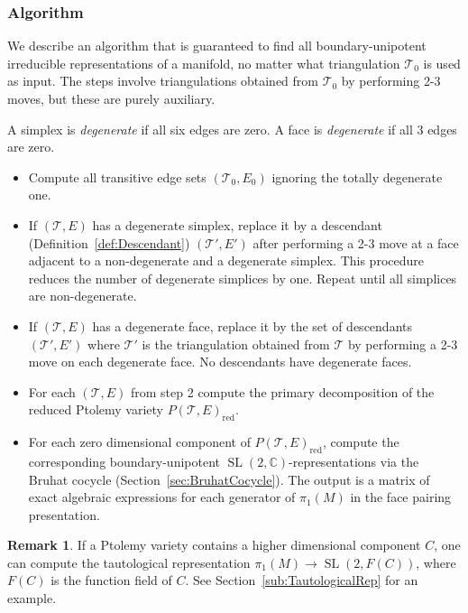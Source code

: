 \documentclass[11pt]{amsart}
\theoremstyle{plain}
\theoremstyle{definition}
\newtheorem{remark}[theorem]{Remark}
\numberwithin{equation}{section}
\newcommand{\C}{\mathbb C}
\newcommand{\T}{\mathcal T}
\DeclareMathOperator{\SL}{SL}
\DeclareMathOperator{\red}{red}
\begin{document}
\subsubsection{Algorithm}
We describe an algorithm that is guaranteed to find all boundary-unipotent irreducible representations of a manifold, no matter what triangulation $\T_0$ is used as input. The steps involve triangulations obtained from $\T_0$ by performing 2-3 moves, but these are purely auxiliary.

A simplex is \emph{degenerate} if all six edges are zero. A face is \emph{degenerate} if all 3 edges are zero.

\begin{itemize}[leftmargin=0.8in, rightmargin=0.2in]
\item[Step 0:] Compute all transitive edge sets $(\T_0,E_0)$ ignoring the totally degenerate one.
\item[Step 1:] If $(\T,E)$ has a degenerate simplex, replace it by a descendant (Definition~\ref{def:Descendant}) $(\T',E')$ after performing a 2-3 move at a face adjacent to a non-degenerate and a degenerate simplex. This procedure reduces the number of degenerate simplices by one. Repeat until all simplices are non-degenerate.
\item[Step 2:] If $(\T,E)$ has a degenerate face, replace it by the set of descendants $(\T',E')$ where $\T'$ is the triangulation obtained from $\T$ by performing a 2-3 move on each degenerate face. No descendants have degenerate faces.
\item[Step 3:] For each $(\T,E)$ from step 2 compute the primary decomposition of the reduced Ptolemy variety $P(\T,E)_{\red}$.
\item[Step 4:]  For each zero dimensional component of $P(\T,E)_{\red}$, compute the corresponding boundary-unipotent $\SL(2,\C)$-representations via the Bruhat cocycle (Section~\ref{sec:BruhatCocycle}). 
The output is a matrix of exact algebraic expressions for each generator of $\pi_1(M)$ in the face pairing presentation.
\end{itemize}



\begin{remark} If a Ptolemy variety contains a higher dimensional component $C$, one can compute the tautological representation $\pi_1(M)\to \SL(2,F(C))$, where $F(C)$ is the function field of $C$. See Section~\ref{sub:TautologicalRep} for an example.
\end{remark}
\end{document}
